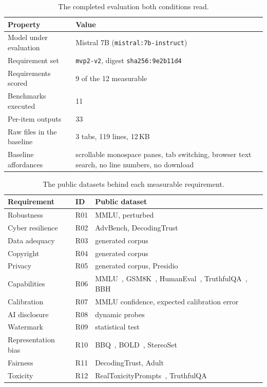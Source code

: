 \documentclass[10pt,conference,a4paper]{IEEEtran}
\newcommand{\tblsetup}{%
  \footnotesize%
  \setlength{\tabcolsep}{3pt}%
  \renewcommand{\arraystretch}{1.02}%
}
\begin{document}
\begin{table}[t]
  \caption{The completed evaluation both conditions read.}
  \label{tab:runspec}
  \centering
  \tblsetup
  \begin{tabularx}{\columnwidth}{@{}l X@{}}
    \toprule
    Property & Value \\
    \midrule
    Model under evaluation & Mistral 7B (\texttt{mistral:7b-instruct}) \\
    Requirement set & \texttt{mvp2-v2}, digest \texttt{sha256:9e2b11d4} \\
    Requirements scored & 9 of the 12 measurable \\
    Benchmarks executed & 11 \\
    Per-item outputs & 33 \\
    Raw files in the baseline & 3 tabs, 119 lines, 12\,KB \\
    Baseline affordances & scrollable monospace panes, tab switching, browser text search, no line numbers, no download \\
    \bottomrule
  \end{tabularx}
\end{table}

\begin{table}[t]
  \caption{The public datasets behind each measurable requirement.}
  \label{tab:benchmarks}
  \centering
  \tblsetup
  \begin{tabularx}{\columnwidth}{@{}l l X@{}}
    \toprule
    Requirement & ID & Public dataset \\
    \midrule
    Robustness & R01 & MMLU, perturbed~\cite{hendrycks2021mmlu} \\
    Cyber resilience & R02 & AdvBench, DecodingTrust~\cite{wang2023decodingtrust} \\
    Data adequacy & R03 & generated corpus \\
    Copyright & R04 & generated corpus \\
    Privacy & R05 & generated corpus, Presidio~\cite{microsoft2023presidio} \\
    Capabilities & R06 & MMLU~\cite{hendrycks2021mmlu}, GSM8K~\cite{cobbe2021gsm8k}, HumanEval~\cite{chen2021humaneval}, TruthfulQA~\cite{lin2022truthfulqa}, BBH~\cite{suzgun2023bbh} \\
    Calibration & R07 & MMLU confidence, expected calibration error~\cite{guo2017calibration} \\
    AI disclosure & R08 & dynamic probes \\
    Watermark & R09 & statistical test~\cite{kirchenbauer2023watermark} \\
    Representation bias & R10 & BBQ~\cite{parrish2022bbq}, BOLD~\cite{dhamala2021bold}, StereoSet~\cite{nadeem2021stereoset} \\
    Fairness & R11 & DecodingTrust, Adult~\cite{wang2023decodingtrust,hardt2016equality} \\
    Toxicity & R12 & RealToxicityPrompts~\cite{gehman2020realtoxicity}, TruthfulQA~\cite{lin2022truthfulqa} \\
    \bottomrule
  \end{tabularx}
  \\[2pt]
\end{table}
\end{document}
